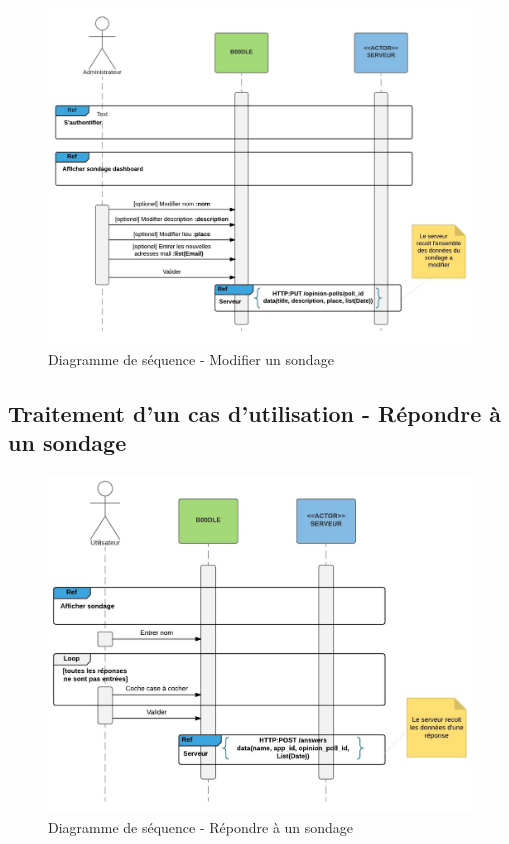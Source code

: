 \documentclass[titlepage]{report}
\begin{document}
\begin{figure}[h]
	\caption{Diagramme de séquence - Modifier un sondage}
	\label{diagramme_sequence_modifierSondage}
	\centering
	\includegraphics[width=\textwidth]{figures/diagrammes/sequence_modifierSondage.png}
\end{figure}

\clearpage

\subsection{Traitement d'un cas d'utilisation - Répondre à un sondage}


\begin{figure}[h]
	\caption{Diagramme de séquence - Répondre à un sondage}
	\label{diagramme_sequence_repondreSondage}
	\centering
	\includegraphics[width=\textwidth]{figures/diagrammes/sequence_repondreSondage.png}
\end{figure}
\end{document}
